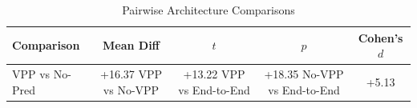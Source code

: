 \begin{table}[t]
\centering
\caption{Pairwise Architecture Comparisons}
\label{tab:architecture_comparisons}
\begin{tabular}{lcccc}
\toprule
Comparison & Mean Diff & $t$ & $p$ & Cohen's $d$ \\
\midrule
VPP vs No-Pred & +16.37%
VPP vs No-VPP & +13.22%
VPP vs End-to-End & +18.35%
No-VPP vs End-to-End & +5.13%
\bottomrule
\end{tabular}
\end{table}
